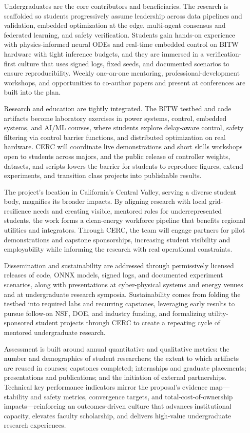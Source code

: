 \documentclass[12pt]{article}
\begin{document}
Undergraduates are the core contributors and beneficiaries. The research is scaffolded so students progressively assume leadership across data pipelines and validation, embedded optimization at the edge, multi-agent consensus and federated learning, and safety verification. Students gain hands-on experience with physics-informed neural ODEs and real-time embedded control on BITW hardware with tight inference budgets, and they are immersed in a verification-first culture that uses signed logs, fixed seeds, and documented scenarios to ensure reproducibility. Weekly one-on-one mentoring, professional-development workshops, and opportunities to co-author papers and present at conferences are built into the plan.

Research and education are tightly integrated. The BITW testbed and code artifacts become laboratory exercises in power systems, control, embedded systems, and AI/ML courses, where students explore delay-aware control, safety filtering via control barrier functions, and distributed optimization on real hardware. CERC will coordinate live demonstrations and short skills workshops open to students across majors, and the public release of controller weights, datasets, and scripts lowers the barrier for students to reproduce figures, extend experiments, and transition class projects into publishable results.

The project's location in California's Central Valley, serving a diverse student body, magnifies its broader impacts. By aligning research with local grid-resilience needs and creating visible, mentored roles for underrepresented students, the work forms a clean-energy workforce pipeline that benefits regional utilities and integrators. Through CERC, the team will engage partners for pilot demonstrations and capstone sponsorships, increasing student visibility and employability while informing the research with real operational constraints.

Dissemination and sustainability are addressed through permissively licensed releases of code, ONNX models, signed logs, and documented experiment scenarios, along with presentations at cyber-physical systems and energy venues and at undergraduate research symposia. Sustainability comes from folding the testbed into required labs and recurring capstones, leveraging early results to pursue follow-on NSF, DOE, and industry funding, and formalizing utility-sponsored student projects through CERC to create a repeating cycle of mentored undergraduate research.

Assessment is built around annual quantitative and qualitative metrics: the number and demographics of student researchers; the extent to which artifacts are reused in courses; capstones completed; internships and graduate placements; presentations and publications; and the initiation of external partnerships. Technical key performance indicators mirror the proposal's evidence map—stability and safety metrics, convergence targets, and total-cost-of-ownership impacts—reinforcing an outcomes-driven culture that advances institutional capacity, elevates faculty scholarship, and delivers high-value undergraduate research experiences.
\end{document}

